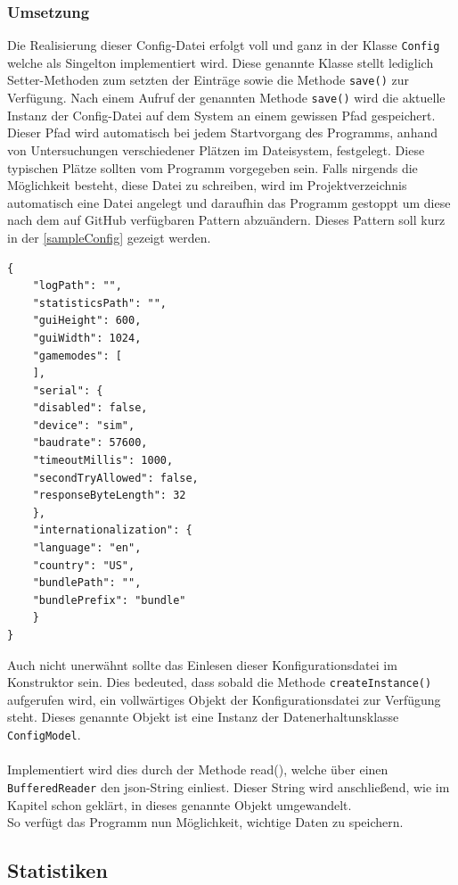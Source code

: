 \subsubsection{Umsetzung}
Die Realisierung dieser Config-Datei erfolgt voll und ganz in der Klasse \lstinline[style=java]{Config} welche als Singelton implementiert wird.
Diese genannte Klasse stellt lediglich Setter-Methoden zum setzten der Einträge sowie die Methode \lstinline[style=java]{save()} zur Verfügung.
Nach einem Aufruf der genannten Methode \lstinline[style=java]{save()} wird die aktuelle Instanz der Config-Datei auf dem System an einem gewissen Pfad gespeichert.
Dieser Pfad wird automatisch bei jedem Startvorgang des Programms, anhand von Untersuchungen verschiedener Plätzen im Dateisystem, festgelegt.
Diese typischen Plätze sollten vom Programm vorgegeben sein.
Falls nirgends die Möglichkeit besteht, diese Datei zu schreiben, wird im Projektverzeichnis automatisch eine Datei angelegt und daraufhin das Programm gestoppt um diese nach dem auf GitHub verfügbaren Pattern abzuändern.
Dieses Pattern soll kurz in der \autoref{sampleConfig} gezeigt werden.
\begin{lstlisting}[style=json, caption=JSON-Codebeispiel,label=sampleConfig]
{
    "logPath": "",
    "statisticsPath": "",
    "guiHeight": 600,
    "guiWidth": 1024,
    "gamemodes": [
    ],
    "serial": {
    "disabled": false,
    "device": "sim",
    "baudrate": 57600,
    "timeoutMillis": 1000,
    "secondTryAllowed": false,
    "responseByteLength": 32
    },
    "internationalization": {
    "language": "en",
    "country": "US",
    "bundlePath": "",
    "bundlePrefix": "bundle"
    }
}
\end{lstlisting}
Auch nicht unerwähnt sollte das Einlesen dieser Konfigurationsdatei im Konstruktor sein.
Dies bedeuted, dass sobald die Methode \lstinline[style=java]{createInstance()} aufgerufen wird, ein vollwärtiges Objekt der Konfigurationsdatei zur Verfügung steht.
Dieses genannte Objekt ist eine Instanz der Datenerhaltunsklasse \lstinline[style=java]{ConfigModel}.\\\\
Implementiert wird dies durch der Methode read(), welche über einen \lstinline[style=java]{BufferedReader} den json-String einliest.
Dieser String wird anschließend, wie im Kapitel  schon geklärt, in dieses genannte Objekt umgewandelt.\\
So verfügt das Programm nun Möglichkeit, wichtige Daten zu speichern.
\subsection{Statistiken}
